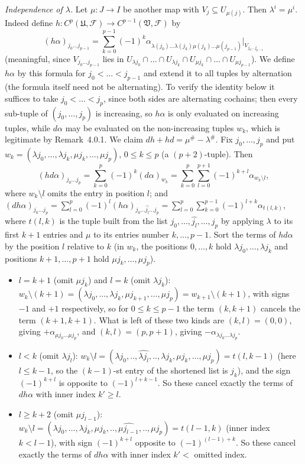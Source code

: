 \documentclass[11pt]{article}
\begin{document}
\emph{Independence of $\lambda$.} Let $\mu:J\to I$ be another map with $V_j\subseteq U_{\mu(j)}$. Then $\lambda^i=\mu^i$. Indeed define $h:C^p(\mathfrak U,\mathcal F)\to C^{p-1}(\mathfrak V,\mathcal F)$ by
\[
(h\alpha)_{j_0\dots j_{p-1}}=\sum_{k=0}^{p-1}(-1)^k\alpha_{\lambda(j_0)\dots\lambda(j_k)\mu(j_k)\dots\mu(j_{p-1})}\big|_{V_{j_0\dots j_{p-1}}}
\]
(meaningful, since $V_{j_0\dots j_{p-1}}$ lies in $U_{\lambda j_0}\cap\dots\cap U_{\lambda j_k}\cap U_{\mu j_k}\cap\dots\cap U_{\mu j_{p-1}}$). We define $h\alpha$ by this formula for $j_0<\dots<j_{p-1}$ and extend it to all tuples by alternation (the formula itself need not be alternating). To verify the identity below it suffices to take $j_0<\dots<j_p$, since both sides are alternating cochains; then every sub-tuple of $(j_0,\dots,j_p)$ is increasing, so $h\alpha$ is only evaluated on increasing tuples, while $d\alpha$ may be evaluated on the non-increasing tuples $w_k$, which is legitimate by Remark~4.0.1. We claim $dh+hd=\mu^\#-\lambda^\#$. Fix $j_0,\dots,j_p$ and put $w_k=(\lambda j_0,\dots,\lambda j_k,\mu j_k,\dots,\mu j_p)$, $0\le k\le p$ (a $(p+2)$-tuple). Then
\[
(hd\alpha)_{j_0\dots j_p}=\sum_{k=0}^p(-1)^k(d\alpha)_{w_k}=\sum_{k=0}^p\sum_{l=0}^{p+1}(-1)^{k+l}\alpha_{w_k\setminus l},
\]
where $w_k\setminus l$ omits the entry in position $l$; and $(dh\alpha)_{j_0\dots j_p}=\sum_{l=0}^p(-1)^l(h\alpha)_{j_0\dots\widehat{j_l}\dots j_p}=\sum_{l=0}^p\sum_{k=0}^{p-1}(-1)^{l+k}\alpha_{t(l,k)}$, where $t(l,k)$ is the tuple built from the list $j_0,\dots,\widehat{j_l},\dots,j_p$ by applying $\lambda$ to its first $k+1$ entries and $\mu$ to its entries number $k,\dots,p-1$. Sort the terms of $hd\alpha$ by the position $l$ relative to $k$ (in $w_k$, the positions $0,\dots,k$ hold $\lambda j_0,\dots,\lambda j_k$ and positions $k+1,\dots,p+1$ hold $\mu j_k,\dots,\mu j_p$).
\begin{itemize}
\item $l=k+1$ (omit $\mu j_k$) and $l=k$ (omit $\lambda j_k$): $w_k\setminus(k+1)=(\lambda j_0,\dots,\lambda j_k,\mu j_{k+1},\dots,\mu j_p)=w_{k+1}\setminus(k+1)$, with signs $-1$ and $+1$ respectively, so for $0\le k\le p-1$ the term $(k,k+1)$ cancels the term $(k+1,k+1)$. What is left of these two kinds are $(k,l)=(0,0)$, giving $+\alpha_{\mu j_0\dots\mu j_p}$, and $(k,l)=(p,p+1)$, giving $-\alpha_{\lambda j_0\dots\lambda j_p}$.
\item $l<k$ (omit $\lambda j_l$): $w_k\setminus l=(\lambda j_0,..,\widehat{\lambda j_l},..,\lambda j_k,\mu j_k,\dots,\mu j_p)=t(l,k-1)$ (here $l\le k-1$, so the $(k-1)$-st entry of the shortened list is $j_k$), and the sign $(-1)^{k+l}$ is opposite to $(-1)^{l+k-1}$. So these cancel exactly the terms of $dh\alpha$ with inner index $k'\ge l$.
\item $l\ge k+2$ (omit $\mu j_{l-1}$): $w_k\setminus l=(\lambda j_0,\dots,\lambda j_k,\mu j_k,..,\widehat{\mu j_{l-1}},..,\mu j_p)=t(l-1,k)$ (inner index $k<l-1$), with sign $(-1)^{k+l}$ opposite to $(-1)^{(l-1)+k}$. So these cancel exactly the terms of $dh\alpha$ with inner index $k'<$ omitted index.
\end{itemize}
\end{document}
